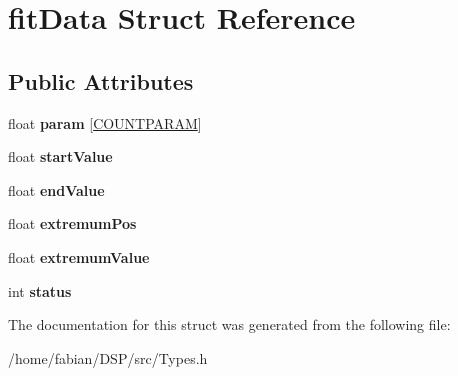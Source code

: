 \hypertarget{structfitData}{\section{fit\-Data Struct Reference}
\label{structfitData}
}
\subsection*{Public Attributes}
\begin{DoxyCompactItemize}
\item 
\hypertarget{structfitData_a9dc59837acfda1ff57f3c8c450c4b34f}{float {\bfseries param} \mbox{[}\hyperlink{Constants_8h_a0df66aec82cc118ec8978ce882abea1c}{C\-O\-U\-N\-T\-P\-A\-R\-A\-M}\mbox{]}}\label{structfitData_a9dc59837acfda1ff57f3c8c450c4b34f}

\item 
\hypertarget{structfitData_a43ca55a48f87d4ee4b56b967f42b2d20}{float {\bfseries start\-Value}}\label{structfitData_a43ca55a48f87d4ee4b56b967f42b2d20}

\item 
\hypertarget{structfitData_a5378631adb5adbf16fce978a23ee274e}{float {\bfseries end\-Value}}\label{structfitData_a5378631adb5adbf16fce978a23ee274e}

\item 
\hypertarget{structfitData_a49e033dcf62bab8507d9c48944f12ec3}{float {\bfseries extremum\-Pos}}\label{structfitData_a49e033dcf62bab8507d9c48944f12ec3}

\item 
\hypertarget{structfitData_a496cb36cda36d83a894b0862ad9197ce}{float {\bfseries extremum\-Value}}\label{structfitData_a496cb36cda36d83a894b0862ad9197ce}

\item 
\hypertarget{structfitData_a3da54e3b439a7153caf422556b57686e}{int {\bfseries status}}\label{structfitData_a3da54e3b439a7153caf422556b57686e}

\end{DoxyCompactItemize}


The documentation for this struct was generated from the following file\-:\begin{DoxyCompactItemize}
\item 
/home/fabian/\-D\-S\-P/src/Types.\-h\end{DoxyCompactItemize}
